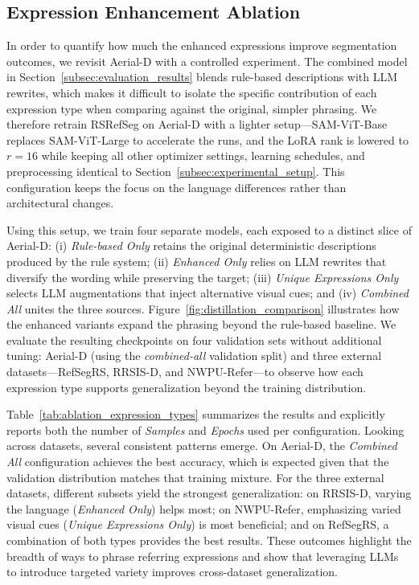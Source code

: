 \subsection{Expression Enhancement Ablation}
\label{subsec:ablation_studies}

In order to quantify how much the enhanced expressions improve segmentation outcomes, we revisit Aerial-D with a controlled experiment. The combined model in Section~\ref{subsec:evaluation_results} blends rule-based descriptions with LLM rewrites, which makes it difficult to isolate the specific contribution of each expression type when comparing against the original, simpler phrasing. We therefore retrain RSRefSeg on Aerial-D with a lighter setup—SAM-ViT-Base replaces SAM-ViT-Large to accelerate the runs, and the LoRA rank is lowered to \(r=16\) while keeping all other optimizer settings, learning schedules, and preprocessing identical to Section~\ref{subsec:experimental_setup}. This configuration keeps the focus on the language differences rather than architectural changes.

Using this setup, we train four separate models, each exposed to a distinct slice of Aerial-D: (i) \emph{Rule-based Only} retains the original deterministic descriptions produced by the rule system; (ii) \emph{Enhanced Only} relies on LLM rewrites that diversify the wording while preserving the target; (iii) \emph{Unique Expressions Only} selects LLM augmentations that inject alternative visual cues; and (iv) \emph{Combined All} unites the three sources. Figure~\ref{fig:distillation_comparison} illustrates how the enhanced variants expand the phrasing beyond the rule-based baseline. We evaluate the resulting checkpoints on four validation sets without additional tuning: Aerial-D (using the \emph{combined-all} validation split) and three external datasets—RefSegRS, RRSIS-D, and NWPU-Refer—to observe how each expression type supports generalization beyond the training distribution.

Table~\ref{tab:ablation_expression_types} summarizes the results and explicitly reports both the number of \emph{Samples} and \emph{Epochs} used per configuration. Looking across datasets, several consistent patterns emerge. On Aerial-D, the \emph{Combined All} configuration achieves the best accuracy, which is expected given that the validation distribution matches that training mixture. For the three external datasets, different subsets yield the strongest generalization: on RRSIS-D, varying the language (\emph{Enhanced Only}) helps most; on NWPU-Refer, emphasizing varied visual cues (\emph{Unique Expressions Only}) is most beneficial; and on RefSegRS, a combination of both types provides the best results. These outcomes highlight the breadth of ways to phrase referring expressions and show that leveraging LLMs to introduce targeted variety improves cross-dataset generalization.

